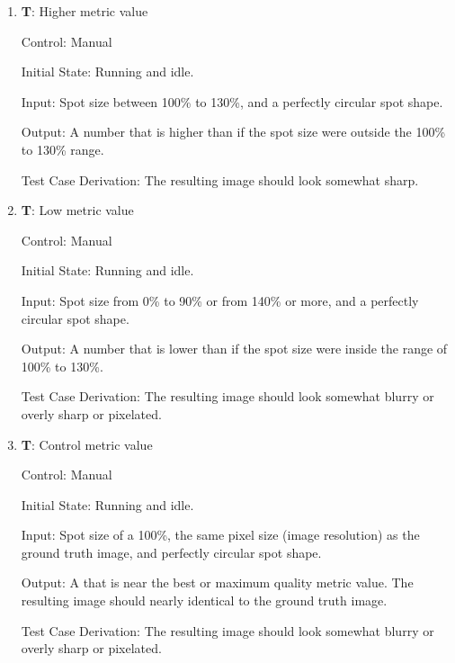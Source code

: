 \documentclass[12pt, titlepage]{article}
\newcounter{testnum} %
\begin{document}
\begin{enumerate}

  \item{\textbf{T\thetestnum \label{T_manualMetricHigh}}: Higher metric value\\}

    Control: Manual
              
    Initial State: Running and idle.
              
    Input: Spot size between 100\% to 130\%, and a perfectly circular spot shape.
              
    Output: A number that is higher than if the spot size were outside the 100\% to 130\% range.

    Test Case Derivation: The resulting image should look somewhat sharp.
					
  \item{\textbf{T\thetestnum \label{T_manualMetricLow}}: Low metric value\\}

  Control: Manual
              
  Initial State: Running and idle.
            
  Input: Spot size from 0\% to 90\% or from 140\% or more, and a perfectly circular spot shape.
            
  Output: A number that is lower than if the spot size were inside the range of 100\% to 130\%.

  Test Case Derivation: The resulting image should look somewhat blurry or overly sharp or pixelated.
  					
  \item{\textbf{T\thetestnum \label{T_manualMetricControl}}: Control metric value\\}

  Control: Manual
              
  Initial State: Running and idle.
            
  Input: Spot size of a 100\%, the same pixel size (image resolution) as the ground truth image, 
  and perfectly circular spot shape.
            
  Output: A that is near the best or maximum quality metric value. The resulting image should nearly
  identical to the ground truth image. 

  Test Case Derivation: The resulting image should look somewhat blurry or overly sharp or pixelated.

\end{enumerate}
\end{document}

